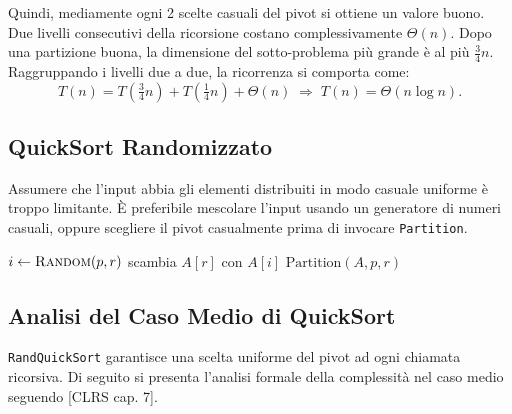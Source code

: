 Quindi, mediamente ogni 2 scelte casuali del pivot si ottiene
un valore buono. Due livelli consecutivi della ricorsione costano
complessivamente $\Theta(n)$. Dopo una partizione buona, la
dimensione del sotto-problema più grande è al più $\frac{3}{4}n$.
Raggruppando i livelli due a due, la ricorrenza si comporta come:
\[
T(n) = T\!\left(\tfrac{3}{4}n\right) + T\!\left(\tfrac{1}{4}n\right)
+ \Theta(n) \;\Rightarrow\; T(n) = \Theta(n \log n).
\]

\subsection{QuickSort Randomizzato}

\begin{softnote}
	Assumere che l'input abbia gli elementi distribuiti in modo casuale
	uniforme è troppo limitante. È preferibile mescolare l'input usando
	un generatore di numeri casuali, oppure scegliere il pivot
	casualmente prima di invocare \texttt{Partition}.
\end{softnote}

\begin{algorithm}[H]
	\caption{RandQuickSort$(A, p, r)$}
\end{algorithm}

\begin{algorithm}[H]
	\caption{RandPartition$(A, p, r)$}
	$i \gets \textsc{Random}(p, r)$\;
	scambia $A[r]$ con $A[i]$\;
	\Return $\text{Partition}(A, p, r)$\;
\end{algorithm}

\subsection{Analisi del Caso Medio di QuickSort}

\begin{softnote}
	\texttt{RandQuickSort} garantisce una scelta uniforme del pivot ad ogni
	chiamata ricorsiva. Di seguito si presenta l'analisi formale
	della complessità nel caso medio seguendo [CLRS cap. 7].
\end{softnote}

